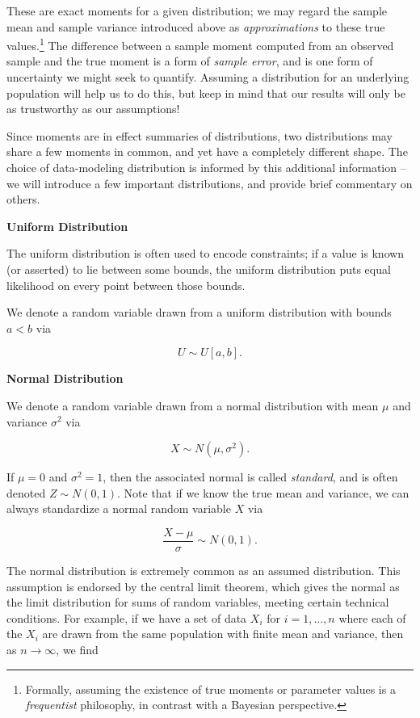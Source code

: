 \documentclass[../primer.tex]{subfiles}
\begin{document}
\noindent These are exact moments for a given distribution; we may regard the
sample mean and sample variance introduced above as \emph{approximations} to
these true values.\footnote{Formally, assuming the existence of true moments or
  parameter values is a \emph{frequentist} philosophy, in contrast with a
  Bayesian perspective.} The difference between a sample moment computed from an
observed sample and the true moment is a form of \emph{sample error}, and is one
form of uncertainty we might seek to quantify. Assuming a distribution for an
underlying population will help us to do this, but keep in mind that our results
will only be as trustworthy as our assumptions!

Since moments are in effect summaries of distributions, two distributions may
share a few moments in common, and yet have a completely different shape. The
choice of data-modeling distribution is informed by this additional information
-- we will introduce a few important distributions, and provide brief commentary
on others.

\noindent\textbf{Uniform Distribution}

The uniform distribution is often used to encode constraints; if a value is
known (or asserted) to lie between some bounds, the uniform distribution puts
equal likelihood on every point between those bounds.

We denote a random variable drawn from a uniform distribution with bounds $a<b$
via

\begin{equation}
  U \sim U[a,b].
\end{equation}

\noindent\textbf{Normal Distribution}

We denote a random variable drawn from a normal distribution with mean $\mu$ and
variance $\sigma^2$ via

\begin{equation}
  X \sim N(\mu, \sigma^2).
\end{equation}

\noindent If $\mu=0$ and $\sigma^2=1$, then the associated normal is called
\emph{standard}, and is often denoted $Z \sim N(0, 1)$. Note that if we know the
true mean and variance, we can always standardize a normal random variable $X$
via

\begin{equation}
  \frac{X - \mu}{\sigma} \sim N(0, 1).
\end{equation}

The normal distribution is extremely common as an assumed distribution. This
assumption is endorsed by the central limit theorem, which gives the normal as
the limit distribution for sums of random variables, meeting certain technical
conditions.\cite{van1998asymptotic} For example, if we have a set of data $X_i$
for $i=1,\dots,n$ where each of the $X_i$ are drawn from the same population
with finite mean and variance, then as $n\to\infty$, we find
\end{document}
